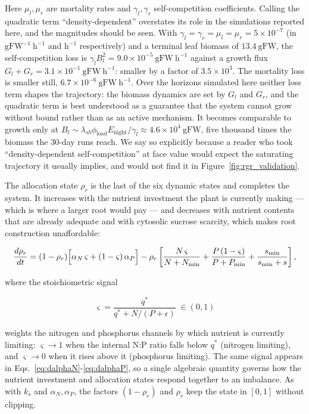 \documentclass[a4paper,fleqn]{cas-sc}
\begin{document}
Here $\mu_l,\mu_r$ are mortality rates and $\gamma_l,\gamma_r$
self-competition coefficients. Calling the quadratic term
``density-dependent'' overstates its role in the simulations reported here,
and the magnitudes should be seen. With
$\gamma_l = \gamma_r = \mu_l = \mu_r = 5\times10^{-7}$ (in
$\mathrm{gFW^{-1}\ h^{-1}}$ and $\mathrm{h^{-1}}$ respectively) and a
terminal leaf biomass of $13.4\ \mathrm{gFW}$, the self-competition loss is
$\gamma_l B_l^2 = 9.0\times10^{-5}\ \mathrm{gFW\ h^{-1}}$ against a growth
flux $G_l + G_r = 3.1\times10^{-1}\ \mathrm{gFW\ h^{-1}}$: smaller by a
factor of $3.5\times10^{3}$. The mortality loss is smaller still,
$6.7\times10^{-6}\ \mathrm{gFW\ h^{-1}}$. Over
the horizons simulated here neither loss term shapes the trajectory: the
biomass dynamics are set by $G_l$ and $G_r$, and the quadratic term is best
understood as a guarantee that the system cannot grow without bound rather
than as an active mechanism. It becomes comparable to growth only at
$B_l \sim \lambda_{sb}\phi_{\text{load}}E_{\text{night}}/\gamma_l
\approx 4.6\times10^{4}\ \mathrm{gFW}$, five thousand times the biomass the
30-day runs reach. We say so explicitly because a reader who took
``density-dependent self-competition'' at face value would expect the
saturating trajectory it usually implies, and would not find it in
Figure~\ref{fig:rgr_validation}.

The allocation state $\rho_r$ is the last of the six dynamic states and
completes the system. It increases with the nutrient investment the plant is
currently making --- which is where a larger root would pay --- and
decreases with nutrient contents that are already adequate and with
cytosolic sucrose scarcity, which makes root construction unaffordable:

\begin{equation}
\frac{d\rho_r}{dt} =
(1-\rho_r)
\Bigl[
\alpha_N\,\varsigma + (1-\varsigma)\,\alpha_P
\Bigr]
- \rho_r
\left[
\frac{N\,\varsigma}{N+N_{\min}}
+ \frac{P\,(1-\varsigma)}{P+P_{\min}}
+ \frac{s_{\min}}{s_{\min}+s}
\right],
\label{eq:drhor}
\end{equation}

where the stoichiometric signal

\begin{equation}
\varsigma =
\frac{q^{*}}{q^{*} + N/(P+\epsilon)}
\;\in (0,1)
\label{eq:stoich_signal}
\end{equation}

weights the nitrogen and phosphorus channels by which nutrient is currently
limiting: $\varsigma \to 1$ when the internal N:P ratio falls below
$q^{*}$ (nitrogen limiting), and $\varsigma \to 0$ when it rises above it
(phosphorus limiting). The same signal appears in
Eqs.~\eqref{eq:dalphaN}-\eqref{eq:dalphaP}, so a single algebraic quantity
governs how the nutrient investment and allocation states respond together
to an imbalance. As with $k_s$ and $\alpha_N,\alpha_P$, the factors
$(1-\rho_r)$ and $\rho_r$ keep the state in $[0,1]$ without clipping.
\end{document}

